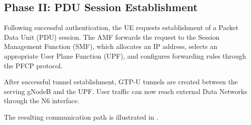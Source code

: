 \documentclass[12pt,a4paper]{article}\usepackage[a4paper,margin=1in]{geometry}\usepackage{graphicx}\usepackage{longtable}\usepackage{booktabs}\usepackage{hyperref}\usepackage{enumitem}\usepackage{amsmath}\usepackage{tikz}\usepackage{pgfgantt}\usepackage{setspace}\setstretch{1.15}\usetikzlibrary{positioning,arrows.meta,shapes.geometric}
\begin{document}
	
	\subsection{Phase II: PDU Session Establishment}
	
	Following successful authentication, the UE requests establishment of a Packet Data Unit (PDU) session. The AMF forwards the request to the Session Management Function (SMF), which allocates an IP address, selects an appropriate User Plane Function (UPF), and configures forwarding rules through the PFCP protocol.
	
	After successful tunnel establishment, GTP-U tunnels are created between the serving gNodeB and the UPF. User traffic can now reach external Data Networks through the N6 interface.
	
	The resulting communication path is illustrated in .
	
\end{document}
